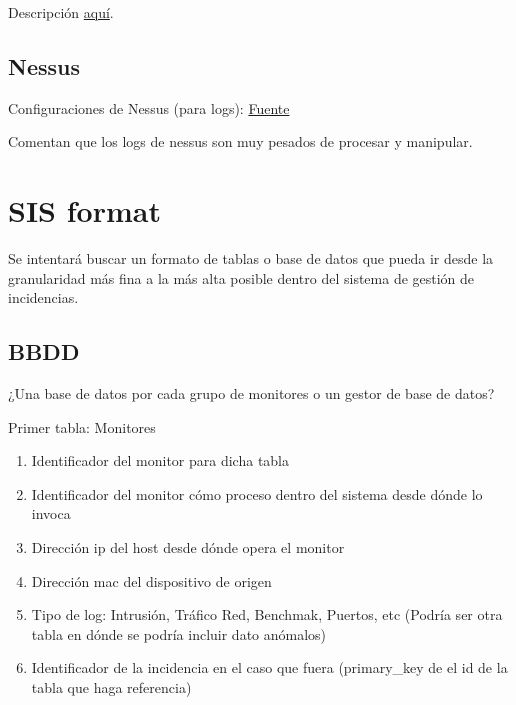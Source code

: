 \documentclass[a4paper,12pt]{article}
\begin{document}
Descripción \href{https://www.manageengine.com/network-monitoring/what-is-snmp.html}{aquí}.

\subsection{Nessus}

Configuraciones de Nessus (para logs): \href{http://wiki.networksecuritytoolkit.org/nstwiki/index.php/Nessus}{Fuente}

Comentan que los logs de nessus son muy pesados de procesar y manipular.

\section{SIS format}

Se intentará buscar un formato de tablas o base de datos que pueda ir desde la granularidad más fina a la más alta posible dentro del sistema de gestión de incidencias.

\subsection{BBDD}

¿Una base de datos por cada grupo de monitores o un gestor de base de datos?

Primer tabla: Monitores \\


\begin{enumerate}
\item Identificador del monitor para dicha tabla
\item Identificador del monitor cómo proceso dentro del sistema desde dónde lo invoca
\item Dirección ip del host desde dónde opera el monitor
\item Dirección mac del dispositivo de origen
\item Tipo de log: Intrusión, Tráfico Red, Benchmak, Puertos, etc (Podría ser otra tabla en dónde se podría incluir dato anómalos)
\item Identificador de la incidencia en el caso que fuera (primary\_key de el id de la tabla que haga referencia)
\end{enumerate}
\end{document}
